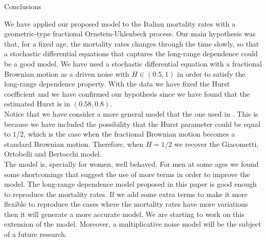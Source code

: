 \documentclass[12pt,reqno]{amsart}
\makeatletter
\def\section{\@startsection{section}{1}%
     \z@{.7\linespacing\@plus\linespacing}{.5\linespacing}%
     {\bfseries
     \centering
     }}
\theoremstyle{definition}
\theoremstyle{remark}
\numberwithin{equation}{section}
\makeatother
\begin{document}
\section{Conclusions}


We have applied our proposed model to the Italian mortality rates with a geometric-type fractional Ornstein-Uhlenbeck process. Our
main hypothesis was that, for a fixed age, the mortality rates changes through the time slowly, so that a stochastic differential equations
that captures the long-range dependence could be a good model. We have used a stochastic differential equation with a fractional Brownian motion as a driven noise with $H\in (0.5,1)$ in order to satisfy the long-range dependence property. With the data we have fixed the Hurst coefficient and we have confirmed our hypothesis since
we have found that the estimated Hurst is in $(0.58,0.8)$.  \\



Notice that we have consider a more general model that the one used in \cite{gi-or-be}. This is because we have included the possibility that the
Hurst parameter could be equal to $1/2$, which is the case when the fractional Brownian motion becomes a standard Brownian motion. Therefore,
when $H=1/2$ we recover the  Giacometti, Ortobelli and Bertocchi model.\\





The model is, specially for women, well behaved. For men at some ages we found some shortcomings that suggest the use of more terms in order to improve
the model. The long-range dependence model proposed in this paper is good enough to reproduce the mortality rates. If we add some extra terms to make it more flexible to reproduce the cases where the mortality rates have more variations then it will generate a more accurate model. We are starting to work on this extension of the model. Moreover, a multiplicative noise model will be the subject of a future research.\\
\end{document}
